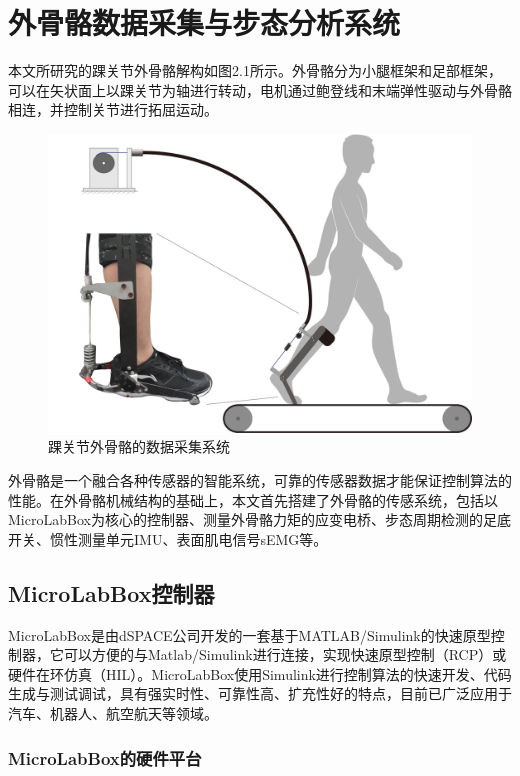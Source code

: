 \chapter{外骨骼数据采集与步态分析系统}

本文所研究的踝关节外骨骼解构如图2.1所示。外骨骼分为小腿框架和足部框架，可以在矢状面上以踝关节为轴进行转动，电机通过鲍登线和末端弹性驱动与外骨骼相连，并控制关节进行拓屈运动。

\begin{figure}[htb]
    \includegraphics[width=12cm]{fig/f19.jpg}
    \caption{踝关节外骨骼的数据采集系统}
    \label{fig:mark}
\end{figure}

外骨骼是一个融合各种传感器的智能系统，可靠的传感器数据才能保证控制算法的性能。在外骨骼机械结构的基础上，本文首先搭建了外骨骼的传感系统，包括以MicroLabBox为核心的控制器、测量外骨骼力矩的应变电桥、步态周期检测的足底开关、惯性测量单元IMU、表面肌电信号sEMG等。

\section{MicroLabBox控制器}

MicroLabBox是由dSPACE公司开发的一套基于MATLAB/Simulink的快速原型控制器，它可以方便的与Matlab/Simulink进行连接，实现快速原型控制（RCP）或硬件在环仿真（HIL）。MicroLabBox使用Simulink进行控制算法的快速开发、代码生成与测试调试，具有强实时性、可靠性高、扩充性好的特点，目前已广泛应用于汽车、机器人、航空航天等领域。

\subsection{MicroLabBox的硬件平台}

